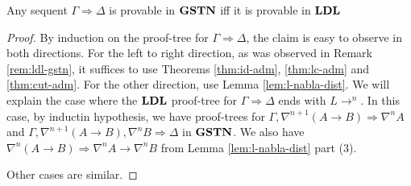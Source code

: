 \begin{thm}
  Any sequent $\Gamma \Rightarrow \Delta$ is provable in $\GSTN$ iff it is provable in $\LDL$
\end{thm}
\begin{proof}
  By induction on the proof-tree for $\Gamma \Rightarrow \Delta$, the claim is easy to observe in both directions. For the left to right direction, as was observed in Remark \ref{rem:ldl-gstn}, it suffices to use Theorems \ref{thm:id-adm}, \ref{thm:lc-adm} and \ref{thm:cut-adm}. For the other direction, use Lemma \ref{lem:l-nabla-dist}. We will explain the case where the $\LDL$ proof-tree for $\Gamma \Rightarrow \Delta$ ends with $L \rightarrow ^n$. In this case, by inductin hypothesis, we have proof-trees for $\Gamma, \nabla^{n+1} (A \rightarrow B) \Rightarrow \nabla^n A$ and $\Gamma, \nabla^{n+1} (A \rightarrow B), \nabla^n B \Rightarrow \Delta$ in $\GSTN$. We also have $\nabla^n (A \rightarrow B) \Rightarrow \nabla^n A \rightarrow \nabla^n B$ from Lemma \ref{lem:l-nabla-dist} part (3).

  \begin{prooftree}


  \end{prooftree}

  Other cases are similar.
\end{proof}